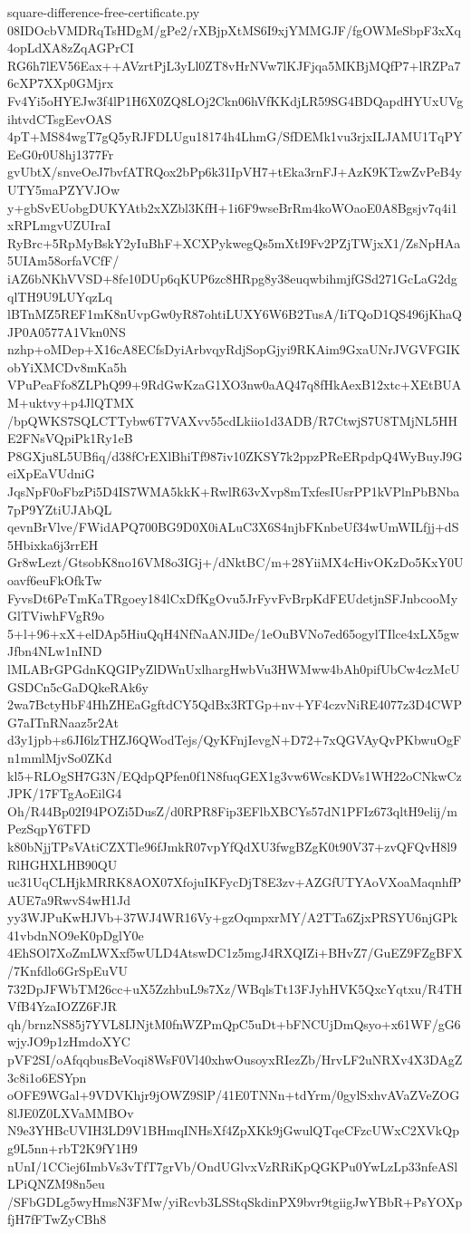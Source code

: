 \documentclass[11pt]{article}
\theoremstyle{definition}
\theoremstyle{remark}
\begin{document}
\begin{filecontents*}[overwrite]{square-difference-free-certificate.py}
08IDOcbVMDRqTsHDgM/gPe2/rXBjpXtMS6I9xjYMMGJF/fgOWMeSbpF3xXq4opLdXA8zZqAGPrCI
RG6h7lEV56Eax++AVzrtPjL3yLl0ZT8vHrNVw7lKJFjqa5MKBjMQfP7+lRZPa76cXP7XXp0GMjrx
Fv4Yi5oHYEJw3f4lP1H6X0ZQ8LOj2Ckn06hVfKKdjLR59SG4BDQapdHYUxUVgihtvdCTsgEevOAS
4pT+MS84wgT7gQ5yRJFDLUgu18174h4LhmG/SfDEMk1vu3rjxILJAMU1TqPYEeG0r0U8hj1377Fr
gvUbtX/snveOeJ7bvfATRQox2bPp6k31IpVH7+tEka3rnFJ+AzK9KTzwZvPeB4yUTY5maPZYVJOw
y+gbSvEUobgDUKYAtb2xXZbl3KfH+1i6F9wseBrRm4koWOaoE0A8Bgsjv7q4i1xRPLmgvUZUIraI
RyBrc+5RpMyBskY2yIuBhF+XCXPykwegQs5mXtI9Fv2PZjTWjxX1/ZsNpHAa5UIAm58orfaVCfF/
iAZ6bNKhVVSD+8fe10DUp6qKUP6zc8HRpg8y38euqwbihmjfGSd271GcLaG2dgqlTH9U9LUYqzLq
lBTnMZ5REF1mK8nUvpGw0yR87ohtiLUXY6W6B2TusA/IiTQoD1QS496jKhaQJP0A0577A1Vkn0NS
nzhp+oMDep+X16cA8ECfsDyiArbvqyRdjSopGjyi9RKAim9GxaUNrJVGVFGIKobYiXMCDv8mKa5h
VPuPeaFfo8ZLPhQ99+9RdGwKzaG1XO3nw0aAQ47q8fHkAexB12xtc+XEtBUAM+uktvy+p4JlQTMX
/bpQWKS7SQLCTTybw6T7VAXvv55cdLkiio1d3ADB/R7CtwjS7U8TMjNL5HHE2FNsVQpiPk1Ry1eB
P8GXju8L5UBfiq/d38fCrEXlBhiTf987iv10ZKSY7k2ppzPReERpdpQ4WyBuyJ9GeiXpEaVUdniG
JqsNpF0oFbzPi5D4IS7WMA5kkK+RwlR63vXvp8mTxfesIUsrPP1kVPlnPbBNba7pP9YZtiUJAbQL
qevnBrVlve/FWidAPQ700BG9D0X0iALuC3X6S4njbFKnbeUf34wUmWILfjj+dS5Hbixka6j3rrEH
Gr8wLezt/GtsobK8no16VM8o3IGj+/dNktBC/m+28YiiMX4cHivOKzDo5KxY0Uoavf6euFkOfkTw
FyvsDt6PeTmKaTRgoey184lCxDfKgOvu5JrFyvFvBrpKdFEUdetjnSFJnbcooMyGlTViwhFVgR9o
5+l+96+xX+elDAp5HiuQqH4NfNaANJIDe/1eOuBVNo7ed65ogylTIlce4xLX5gwJfbn4NLw1nIND
lMLABrGPGdnKQGIPyZlDWnUxlhargHwbVu3HWMww4bAh0pifUbCw4czMcUGSDCn5cGaDQkeRAk6y
2wa7BctyHbF4HhZHEaGgftdCY5QdBx3RTGp+nv+YF4czvNiRE4077z3D4CWPG7aITnRNaaz5r2At
d3y1jpb+s6JI6lzTHZJ6QWodTejs/QyKFnjIevgN+D72+7xQGVAyQvPKbwuOgFn1mmlMjvSo0ZKd
kl5+RLOgSH7G3N/EQdpQPfen0f1N8fuqGEX1g3vw6WcsKDVs1WH22oCNkwCzJPK/17FTgAoEilG4
Oh/R44Bp02I94POZi5DusZ/d0RPR8Fip3EFlbXBCYs57dN1PFIz673qltH9elij/mPezSqpY6TFD
k80bNjjTPsVAtiCZXTle96fJmkR07vpYfQdXU3fwgBZgK0t90V37+zvQFQvH8l9RlHGHXLHB90QU
uc31UqCLHjkMRRK8AOX07XfojuIKFycDjT8E3zv+AZGfUTYAoVXoaMaqnhfPAUE7a9RwvS4wH1Jd
yy3WJPuKwHJVb+37WJ4WR16Vy+gzOqmpxrMY/A2TTa6ZjxPRSYU6njGPk41vbdnNO9eK0pDglY0e
4EhSOl7XoZmLWXxf5wULD4AtswDC1z5mgJ4RXQIZi+BHvZ7/GuEZ9FZgBFX/7Knfdlo6GrSpEuVU
732DpJFWbTM26cc+uX5ZzhbuL9s7Xz/WBqlsTt13FJyhHVK5QxcYqtxu/R4THVfB4YzaIOZZ6FJR
qh/brnzNS85j7YVL8IJNjtM0fnWZPmQpC5uDt+bFNCUjDmQsyo+x61WF/gG6wjyJO9p1zHmdoXYC
pVF2SI/oAfqqbusBeVoqi8WsF0Vl40xhwOusoyxRIezZb/HrvLF2uNRXv4X3DAgZ3c8i1o6ESYpn
oOFE9WGal+9VDVKhjr9jOWZ9SlP/41E0TNNn+tdYrm/0gylSxhvAVaZVeZOG8lJE0Z0LXVaMMBOv
N9e3YHBcUVIH3LD9V1BHmqINHsXf4ZpXKk9jGwulQTqeCFzcUWxC2XVkQpg9L5nn+rbT2K9fY1H9
nUnI/1CCiej6ImbVs3vTfT7grVb/OndUGlvxVzRRiKpQGKPu0YwLzLp33nfeASlLPiQNZM98n5eu
/SFbGDLg5wyHmsN3FMw/yiRcvb3LSStqSkdinPX9bvr9tgiigJwYBbR+PsYOXpfjH7fFTwZyCBh8

\end{filecontents*}
\end{document}

